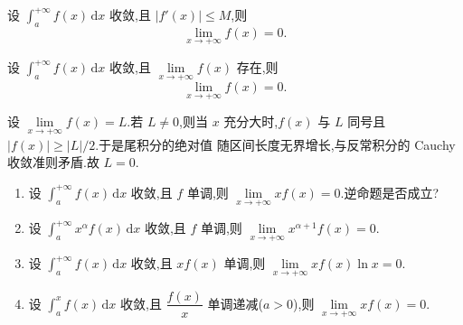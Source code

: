 \begin{corollary}[\markstar]
  设 $\displaystyle\int_a^{+\infty}f(x)\,\mathrm{d}x$ 收敛,且 $|f'(x)|\leq M$,则
  \[
    \displaystyle\lim\limits_{x\to+\infty}f(x)=0.
  \]
\end{corollary}

\begin{example}
  设 $\displaystyle\int_a^{+\infty}f(x)\,\mathrm{d}x$ 收敛,且 $\displaystyle\lim\limits_{x\to+\infty}f(x)$ 存在,则
  \[
    \displaystyle\lim\limits_{x\to+\infty}f(x)=0.
  \]
\end{example}
\exampleblank

\begin{solution}
  设 $\displaystyle\lim\limits_{x\to+\infty}f(x)=L$.若 $L\neq0$,则当 $x$
  充分大时,$f(x)$ 与 $L$ 同号且 $|f(x)|\geq|L|/2$.于是尾积分的绝对值
  随区间长度无界增长,与反常积分的 Cauchy 收敛准则矛盾.故 $L=0$.
\end{solution}

\begin{example}
  \begin{enumerate}
    \item 设 $\displaystyle\int_a^{+\infty}f(x)\,\mathrm{d}x$ 收敛,且 $f$ 单调,则 $\displaystyle\lim\limits_{x\to+\infty}xf(x)=0$.逆命题是否成立?
    \item 设 $\displaystyle\int_a^{+\infty}x^\alpha f(x)\,\mathrm{d}x$ 收敛,且 $f$ 单调,则 $\displaystyle\lim\limits_{x\to+\infty}x^{\alpha+1}f(x)=0$.
    \item 设 $\displaystyle\int_a^{+\infty}f(x)\,\mathrm{d}x$ 收敛,且 $xf(x)$ 单调,则 $\displaystyle\lim\limits_{x\to+\infty}xf(x)\ln x=0$.
    \item 设 $\displaystyle\int_a^x f(x)\,\mathrm{d}x$ 收敛,且 $\dfrac{f(x)}{x}$ 单调递减($a>0$),则 $\displaystyle\lim\limits_{x\to+\infty}xf(x)=0$.
  \end{enumerate}
\end{example}
\exampleblank

